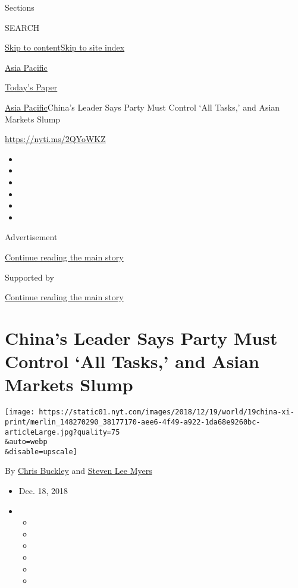 Sections

SEARCH

\protect\hyperlink{site-content}{Skip to
content}\protect\hyperlink{site-index}{Skip to site index}

\href{https://www.nytimes.com/section/world/asia}{Asia Pacific}

\href{https://myaccount.nytimes.com/auth/login?response_type=cookie\&client_id=vi}{}

\href{https://www.nytimes.com/section/todayspaper}{Today's Paper}

\href{/section/world/asia}{Asia Pacific}\textbar{}China's Leader Says
Party Must Control `All Tasks,' and Asian Markets Slump

\url{https://nyti.ms/2QYoWKZ}

\begin{itemize}
\item
\item
\item
\item
\item
\item
\end{itemize}

Advertisement

\protect\hyperlink{after-top}{Continue reading the main story}

Supported by

\protect\hyperlink{after-sponsor}{Continue reading the main story}

\hypertarget{chinas-leader-says-party-must-control-all-tasks-and-asian-markets-slump}{%
\section{China's Leader Says Party Must Control `All Tasks,' and Asian
Markets
Slump}\label{chinas-leader-says-party-must-control-all-tasks-and-asian-markets-slump}}

\texttt{[image: https://static01.nyt.com/images/2018/12/19/world/19china-xi-print/merlin\_148270290\_38177170-aee6-4f49-a922-1da68e9260bc-articleLarge.jpg?quality=75\\\&auto=webp\\\&disable=upscale]}

By \href{https://www.nytimes.com/by/chris-buckley}{Chris Buckley} and
\href{https://www.nytimes.com/by/steven-lee-myers}{Steven Lee Myers}

\begin{itemize}
\item
  Dec. 18, 2018
\item
  \begin{itemize}
  \item
  \item
  \item
  \item
  \item
  \item
  \end{itemize}
\end{itemize}

